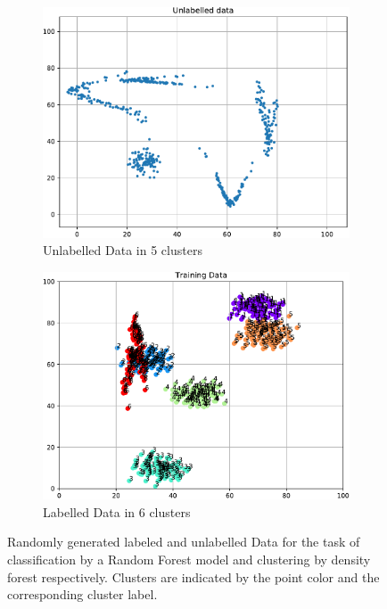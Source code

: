 \documentclass{article}
\begin{document}
\begin{figure}[H]
    \begin{subfigure}{0.49\textwidth}
        \centering
        \includegraphics[width=\textwidth]{unlabelled-data.pdf}
        \caption{Unlabelled Data in 5 clusters}
        \label{subfig:unlabelled-data}
    \end{subfigure}
    \begin{subfigure}{0.49\textwidth}
        \centering
        \includegraphics[width=\textwidth]{labelled-data.pdf}
        \caption{Labelled Data in 6 clusters}
        \label{subfig:labelled-data}
    \end{subfigure}
    \caption{Randomly generated labeled and unlabelled Data for the task of classification by a Random Forest model and clustering by density forest respectively. Clusters are indicated by the point color and the corresponding cluster label.}
    \label{fig:gen-data}
\end{figure}
\end{document}
